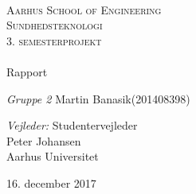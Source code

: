 
\begin{titlingpage}
\begin{center}

~ \\[3cm]


\textsc{\LARGE Aarhus School of Engineering}\\[1.5cm]

\textsc{\Large Sundhedsteknologi}\\
\textsc{\Large 3. semesterprojekt}\\[0.5cm]

\noindent\makebox[\linewidth]{\rule{\textwidth}{0.4pt}}\\
[0.5cm]{\Huge Rapport}
\noindent\makebox[\linewidth]{\rule{\textwidth}{0.4pt}}

\end{center}



\textit{Gruppe 2} \newline
Martin Banasik\tab(201408398) \newline	





\textit{Vejleder:} \newline
Studentervejleder\\
Peter Johansen\\
Aarhus Universitet


\vfill

\begin{center}
{\large 16. december 2017}
\end{center}


\end{titlingpage}